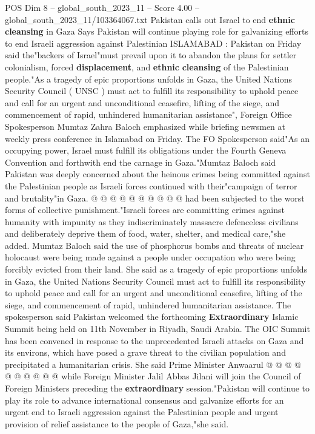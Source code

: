 \begin{textsample}{POS Dim 8 – global\_south\_2023\_11 – Score 4.00 – global\_south\_2023\_11/103364067.txt}  \label{ex:f8_pos_363}
Pakistan calls out Israel to end \textbf{ethnic} \textbf{cleansing} in Gaza Says Pakistan will continue playing role for galvanizing efforts to end Israeli aggression against Palestinian ISLAMABAD : Pakistan on Friday said the"backers of Israel"must prevail upon it to abandon the plans for settler colonialism, forced \textbf{displacement}, and \textbf{ethnic} \textbf{cleansing} of the Palestinian people."As a tragedy of epic proportions unfolds in Gaza, the United Nations Security Council ( UNSC ) must act to fulfill its responsibility to uphold peace and call for an urgent and unconditional ceasefire, lifting of the siege, and commencement of rapid, unhindered humanitarian assistance", Foreign Office Spokesperson Mumtaz Zahra Baloch emphasized while briefing newsmen at weekly press conference in Islamabad on Friday.
The FO Spokesperson said"As an occupying power, Israel must fulfill its obligations under the Fourth Geneva Convention and forthwith end the carnage in Gaza."Mumtaz Baloch said Pakistan was deeply concerned about the heinous crimes being committed against the Palestinian people as Israeli forces continued with their"campaign of terror and brutality"in Gaza. @ @ @ @ @ @ @ @ @ @ had been subjected to the worst forms of collective punishment."Israeli forces are committing crimes against humanity with impunity as they indiscriminately massacre defenceless civilians and deliberately deprive them of food, water, shelter, and medical care,"she added.
Mumtaz Baloch said the use of phosphorus bombs and threats of nuclear holocaust were being made against a people under occupation who were being forcibly evicted from their land.
She said as a tragedy of epic proportions unfolds in Gaza, the United Nations Security Council must act to fulfill its responsibility to uphold peace and call for an urgent and unconditional ceasefire, lifting of the siege, and commencement of rapid, unhindered humanitarian assistance.
The spokesperson said Pakistan welcomed the forthcoming \textbf{Extraordinary} Islamic Summit being held on 11th November in Riyadh, Saudi Arabia.
The OIC Summit has been convened in response to the unprecedented Israeli attacks on Gaza and its environs, which have posed a grave threat to the civilian population and precipitated a humanitarian crisis.
She said Prime Minister Anwaarul @ @ @ @ @ @ @ @ @ @ while Foreign Minister Jalil Abbas Jilani will join the Council of Foreign Ministers preceding the \textbf{extraordinary} session."Pakistan will continue to play its role to advance international consensus and galvanize efforts for an urgent end to Israeli aggression against the Palestinian people and urgent provision of relief assistance to the people of Gaza,"she said.

\end{textsample}
